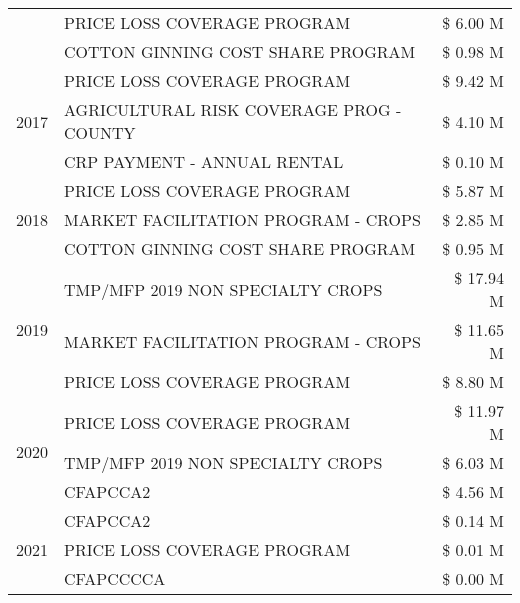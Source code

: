 \begin{tabular}{llr}
 & PRICE LOSS COVERAGE PROGRAM & \$ 6.00 M \\
 & COTTON GINNING COST SHARE PROGRAM & \$ 0.98 M \\
\cline{1-3}
\multirow[t]{3}{*}{2017} & PRICE LOSS COVERAGE PROGRAM & \$ 9.42 M \\
 & AGRICULTURAL RISK COVERAGE PROG - COUNTY & \$ 4.10 M \\
 & CRP PAYMENT - ANNUAL RENTAL & \$ 0.10 M \\
\cline{1-3}
\multirow[t]{3}{*}{2018} & PRICE LOSS COVERAGE PROGRAM & \$ 5.87 M \\
 & MARKET FACILITATION PROGRAM - CROPS & \$ 2.85 M \\
 & COTTON GINNING COST SHARE PROGRAM & \$ 0.95 M \\
\cline{1-3}
\multirow[t]{3}{*}{2019} & TMP/MFP 2019 NON SPECIALTY CROPS & \$ 17.94 M \\
 & MARKET FACILITATION PROGRAM - CROPS & \$ 11.65 M \\
 & PRICE LOSS COVERAGE PROGRAM & \$ 8.80 M \\
\cline{1-3}
\multirow[t]{3}{*}{2020} & PRICE LOSS COVERAGE PROGRAM & \$ 11.97 M \\
 & TMP/MFP 2019 NON SPECIALTY CROPS & \$ 6.03 M \\
 & CFAPCCA2 & \$ 4.56 M \\
\cline{1-3}
\multirow[t]{3}{*}{2021} & CFAPCCA2 & \$ 0.14 M \\
 & PRICE LOSS COVERAGE PROGRAM & \$ 0.01 M \\
 & CFAPCCCCA & \$ 0.00 M \\
\cline{1-3}
\bottomrule
\end{tabular}
